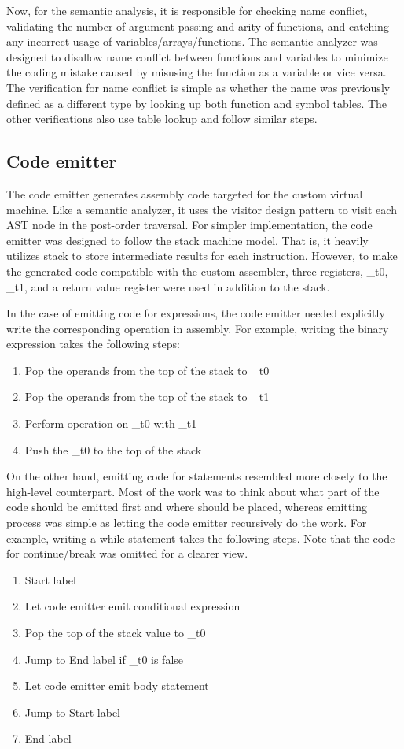 \documentclass[manuscript,screen,nonacm]{acmart}
\begin{document}
Now, for the semantic analysis, it is responsible for checking name conflict, validating the number of argument passing and arity of functions, and catching any incorrect usage of variables/arrays/functions. The semantic analyzer was designed to disallow name conflict between functions and variables to minimize the coding mistake caused by misusing the function as a variable or vice versa. The verification for name conflict is simple as whether the name was previously defined as a different type by looking up both function and symbol tables. The other verifications also use table lookup and follow similar steps.

\subsection{Code emitter}
The code emitter generates assembly code targeted for the custom virtual machine. Like a semantic analyzer, it uses the visitor design pattern to visit each AST node in the post-order traversal.
For simpler implementation, the code emitter was designed to follow the stack machine model. That is, it heavily utilizes stack to store intermediate results for each instruction. However, to make the generated code compatible with the custom assembler, three registers, \_t0, \_t1, and a return value register were used in addition to the stack. 

In the case of emitting code for expressions, the code emitter needed explicitly write the corresponding operation in assembly. For example, writing the binary expression takes the following steps: 
\begin{enumerate}
    \item Pop the operands from the top of the stack to \_t0
    \item Pop the operands from the top of the stack to \_t1
    \item Perform operation on \_t0 with \_t1 
    \item Push the \_t0 to the top of the stack
\end{enumerate}

On the other hand, emitting code for statements resembled more closely to the high-level counterpart. Most of the work was to think about what part of the code should be emitted first and where should be placed, whereas emitting process was simple as letting the code emitter recursively do the work. For example, writing a while statement takes the following steps. Note that the code for continue/break was omitted for a clearer view.
\begin{enumerate}
    \item Start label
    \item Let code emitter emit conditional expression
    \item Pop the top of the stack value to \_t0
    \item Jump to End label if \_t0 is false 
    \item Let code emitter emit body statement
    \item Jump to Start label
    \item End label 
\end{enumerate} 
\end{document}
